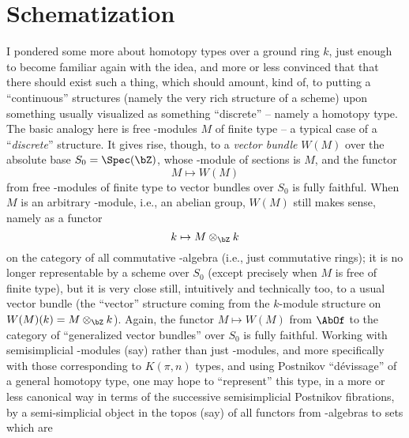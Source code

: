









\chapter{Schematization}
\label{ch:VI}

\presectionfill{}\par

\label{sec:110}%
I pondered some more about homotopy types over a ground ring $k$, just
enough to become familiar again with the idea, and more or less
convinced that that there should exist such a thing, which should
amount, kind of, to putting a ``continuous'' structures (namely the
very rich structure of a scheme) upon something usually visualized as
something ``discrete'' -- namely a homotopy type. The basic analogy
here is free \bZ-modules $M$ of finite type -- a typical case of a
``\emph{discrete}'' structure. It gives rise, though, to a
\emph{vector bundle} $W(M)$ over the absolute base $S_0=\Spec(\bZ)$,
whose \bZ-module of sections is $M$, and the functor
\[M\mapsto W(M)\]
from free \bZ-modules of finite type to vector bundles over $S_0$ is
fully faithful. When $M$ is an arbitrary \bZ-module, i.e., an abelian
group, $W(M)$ still makes sense, namely as a functor
\[k\mapsto M\otimes_\bZ k\]
on the category of all commutative \bZ-algebra (i.e., just commutative
rings); it is no longer representable by a scheme over $S_0$ (except
precisely when $M$ is free of finite type), but it is very close
still, intuitively and technically too, to a usual vector bundle (the
``vector'' structure coming from the $k$-module structure on
$W(M)(k)=M\otimes_\bZ k$). Again, the functor $M\mapsto W(M)$ from
$\AbOf$ to the category of ``generalized vector bundles'' over $S_0$
is fully faithful. Working with semisimplicial \bZ-modules (say)
rather than just \bZ-modules, and more specifically with those
corresponding to $K(\pi,n)$ types, and using Postnikov
``dévissage''
of a general homotopy type, one may hope to ``represent'' this type,
in a more or less canonical way in terms of the successive
semisimplicial Postnikov fibrations, by a semi-simplicial object in
the topos (say) of all functors from \bZ-algebras to sets which are
